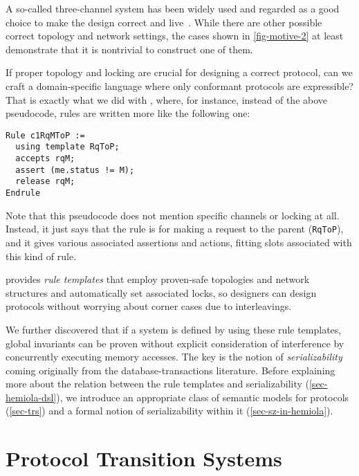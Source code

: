 \documentclass[sigplan,10pt,review,anonymous,screen]{acmart}\settopmatter{printfolios=true,printccs=false,printacmref=false}
\def\slstinline{\lstinline[basicstyle=\ttfamily\small]}
\begin{document}
A so-called three-channel system has been widely used and regarded as a good choice to make the design correct and live~\cite{Murali:2015,thesis:Murali:2016}.
While there are other possible correct topology and network settings, the cases shown in \autoref{fig-motive-2} at least demonstrate that it is nontrivial to construct one of them.

If proper topology and locking are crucial for designing a correct protocol, can we craft a domain-specific language where only conformant protocols are expressible?
That is exactly what we did with \hemiola{}, where, for instance, instead of the above pseudocode, rules are written more like the following one:
\begin{lstlisting}
Rule c1RqMToP :=
  using template RqToP;
  accepts rqM;
  assert (me.status != M);
  release rqM;
Endrule
\end{lstlisting}
Note that this pseudocode does not mention specific channels or locking at all.
Instead, it just says that the rule is for making a request to the parent (\slstinline{RqToP}), and it gives various associated assertions and actions, fitting slots associated with this kind of rule.

\hemiola{} provides \emph{rule templates} that employ proven-safe topologies and network structures and automatically set associated locks, so designers can design protocols without worrying about corner cases due to interleavings.

We further discovered that if a system is defined by using these rule templates, global invariants can be proven without explicit consideration of interference by concurrently executing memory accesses.
The key is the notion of \emph{serializability} coming originally from the database-transactions literature.
Before explaining more about the relation between the rule templates and serializability (\autoref{sec-hemiola-dsl}), we introduce an appropriate class of semantic models for protocols (\autoref{sec-trs}) and a formal notion of serializability within it (\autoref{sec-sz-in-hemiola}).

\section{Protocol Transition Systems}
\label{sec-trs}
\end{document}
